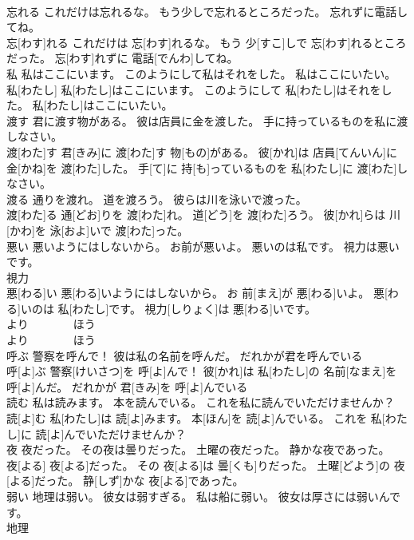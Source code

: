\documentclass[8pt]{extreport}
\begin{document}
\begin{CJK}{UTF8}{min}
\\	忘れる これだけは忘れるな。 もう少しで忘れるところだった。 忘れずに電話してね。	
\\	忘[わす]れる これだけは 忘[わす]れるな。 もう 少[すこ]しで 忘[わす]れるところだった。 忘[わす]れずに 電話[でんわ]してね。
\\	私 私はここにいます。 このようにして私はそれをした。 私はここにいたい。	
\\	私[わたし] 私[わたし]はここにいます。 このようにして 私[わたし]はそれをした。 私[わたし]はここにいたい。
\\	渡す 君に渡す物がある。 彼は店員に金を渡した。 手に持っているものを私に渡しなさい。	
\\	渡[わた]す 君[きみ]に 渡[わた]す 物[もの]がある。 彼[かれ]は 店員[てんいん]に 金[かね]を 渡[わた]した。 手[て]に 持[も]っているものを 私[わたし]に 渡[わた]しなさい。
\\	渡る 通りを渡れ。 道を渡ろう。 彼らは川を泳いで渡った。	
\\	渡[わた]る 通[どお]りを 渡[わた]れ。 道[どう]を 渡[わた]ろう。 彼[かれ]らは 川[かわ]を 泳[およ]いで 渡[わた]った。
\\	悪い 悪いようにはしないから。 お前が悪いよ。 悪いのは私です。 視力は悪いです。	
\\	視力 
\\	悪[わる]い 悪[わる]いようにはしないから。 お 前[まえ]が 悪[わる]いよ。 悪[わる]いのは 私[わたし]です。 視力[しりょく]は 悪[わる]いです。
\\	より　　　　ほう	
\\	より　　　　ほう
\\	呼ぶ 警察を呼んで！ 彼は私の名前を呼んだ。 だれかが君を呼んでいる	
\\	呼[よ]ぶ 警察[けいさつ]を 呼[よ]んで！ 彼[かれ]は 私[わたし]の 名前[なまえ]を 呼[よ]んだ。 だれかが 君[きみ]を 呼[よ]んでいる
\\	読む 私は読みます。 本を読んでいる。 これを私に読んでいただけませんか？	
\\	読[よ]む 私[わたし]は 読[よ]みます。 本[ほん]を 読[よ]んでいる。 これを 私[わたし]に 読[よ]んでいただけませんか？
\\	夜 夜だった。 その夜は曇りだった。 土曜の夜だった。 静かな夜であった。	
\\	夜[よる] 夜[よる]だった。 その 夜[よる]は 曇[くも]りだった。 土曜[どよう]の 夜[よる]だった。 静[しず]かな 夜[よる]であった。
\\	弱い 地理は弱い。 彼女は弱すぎる。 私は船に弱い。 彼女は厚さには弱いんです。	
\\	地理 

\end{CJK}
\end{document}
